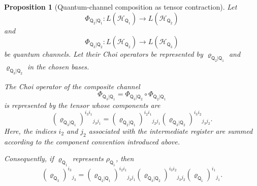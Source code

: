 \documentclass[
    aps,
    pra,
    reprint,
    superscriptaddress,
    nofootinbib
]{revtex4-2}
\theoremstyle{definition}
\theoremstyle{plain}
\newtheorem{proposition}[theorem]{Proposition}
\begin{document}
\begin{proposition}[Quantum-channel composition as tensor contraction]
    \label{prop:channel-composition}
    Let
    \begin{equation}
        \Phi_{\mathsf{Q}_{2}|\mathsf{Q}_{1}}:
        L(\mathcal{H}_{\mathsf{Q}_{1}})
        \to
        L(\mathcal{H}_{\mathsf{Q}_{2}})
    \end{equation}
    and
    \begin{equation}
        \Phi_{\mathsf{Q}_{3}|\mathsf{Q}_{2}}:
        L(\mathcal{H}_{\mathsf{Q}_{2}})
        \to
        L(\mathcal{H}_{\mathsf{Q}_{3}})
    \end{equation}
    be quantum channels. Let their Choi operators be represented by
    $\varrho_{\mathsf{Q}_{2}|\mathsf{Q}_{1}}$ and
    $\varrho_{\mathsf{Q}_{3}|\mathsf{Q}_{2}}$ in the chosen bases.

    The Choi operator of the composite channel
    \begin{equation}
        \Phi_{\mathsf{Q}_{3}|\mathsf{Q}_{1}}
        =
        \Phi_{\mathsf{Q}_{3}|\mathsf{Q}_{2}}
        \circ
        \Phi_{\mathsf{Q}_{2}|\mathsf{Q}_{1}}
    \end{equation}
    is represented by the tensor whose components are
    \begin{equation}
        \left(
            \varrho_{\mathsf{Q}_{3}|\mathsf{Q}_{1}}
        \right)^{i_{3}i_{1}}{}_{j_{3}j_{1}}
        =
        \left(
            \varrho_{\mathsf{Q}_{2}|\mathsf{Q}_{1}}
        \right)^{i_{2}i_{1}}{}_{j_{2}j_{1}}
        \left(
            \varrho_{\mathsf{Q}_{3}|\mathsf{Q}_{2}}
        \right)^{i_{3}i_{2}}{}_{j_{3}j_{2}}.
    \end{equation}
    Here, the indices $i_{2}$ and $j_{2}$ associated with the
    intermediate register are summed according to the component
    convention introduced above.

    Consequently, if
    $\varrho_{\mathsf{Q}_{1}}$ represents
    $\rho_{\mathsf{Q}_{1}}$, then
    \begin{equation}
        \left(
            \varrho_{\mathsf{Q}_{3}}
        \right)^{i_{3}}{}_{j_{3}}
        =
        \left(
            \varrho_{\mathsf{Q}_{2}|\mathsf{Q}_{1}}
        \right)^{i_{2}i_{1}}{}_{j_{2}j_{1}}
        \left(
            \varrho_{\mathsf{Q}_{3}|\mathsf{Q}_{2}}
        \right)^{i_{3}i_{2}}{}_{j_{3}j_{2}}
        \left(
            \varrho_{\mathsf{Q}_{1}}
        \right)^{i_{1}}{}_{j_{1}}.
    \end{equation}
\end{proposition}
\end{document}
